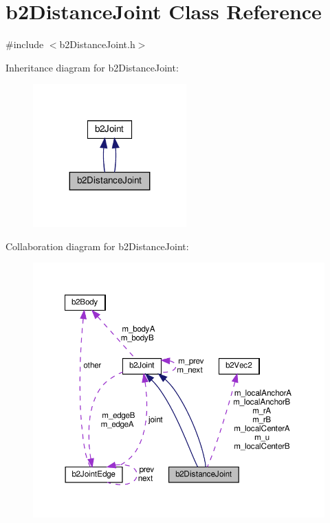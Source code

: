\hypertarget{classb2DistanceJoint}{}\section{b2\+Distance\+Joint Class Reference}
\label{classb2DistanceJoint}


{\ttfamily \#include $<$b2\+Distance\+Joint.\+h$>$}



Inheritance diagram for b2\+Distance\+Joint\+:
\nopagebreak
\begin{figure}[H]
\begin{center}
\leavevmode
\includegraphics[width=167pt]{classb2DistanceJoint__inherit__graph}
\end{center}
\end{figure}


Collaboration diagram for b2\+Distance\+Joint\+:
\nopagebreak
\begin{figure}[H]
\begin{center}
\leavevmode
\includegraphics[width=350pt]{classb2DistanceJoint__coll__graph}
\end{center}
\end{figure}
